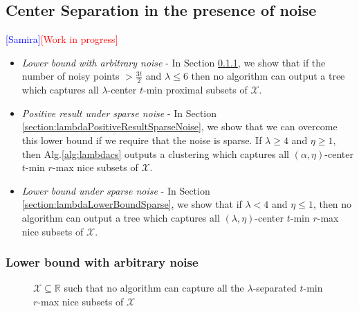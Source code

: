 \documentclass[anon,12pt]{colt2016} %
\newcommand{\mc}{\mathcal}
\newcommand{\wip}{\textcolor{red}{[Work in progress]}\xspace}
\newcommand{\samira}{\textcolor{blue}{[Samira]}\xspace}
\begin{document}
\subsection{Center Separation in the presence of noise}
\samira\wip
%
%
%

\begin{itemize}
\item {\it Lower bound with arbitrary noise} - In Section \ref{section:lambdaLowerBoundArbitrary}, we show that if the number of noisy points $> \frac{3t}{2}$ and $\lambda \le 6$ then no algorithm can output a tree which captures all $\lambda$-center $t$-min proximal subsets of $\mc X$.
\item  {\it Positive result under sparse noise} - In Section \ref{section:lambdaPositiveResultSparseNoise}, we show that we can overcome this lower bound if we require that the noise is sparse. If $\lambda \ge 4$ and $\eta \ge 1$, then Alg.\ref{alg:lambdacs} outputs a clustering which captures all $(\alpha, \eta)$-center $t$-min $r$-max nice subsets of $\mc X$.
\item  {\it Lower bound under sparse noise} - In Section \ref{section:lambdaLowerBoundSparse}, we show that if $\lambda < 4$ and $\eta \le 1$, then no algorithm can output a tree which captures all $(\lambda, \eta)$-center $t$-min $r$-max nice subsets of $\mc X$.
\end{itemize} 


\subsubsection{Lower bound with arbitrary noise}
\label{section:lambdaLowerBoundArbitrary}
\begin{figure}

\caption{$\mc X \subseteq \mathbb{R}$ such that no algorithm can capture all the $\lambda$-separated $t$-min $r$-max nice subsets of $\mc X$}
\label{fig:nosparsealglambdacs}
\end{figure}
\end{document}

